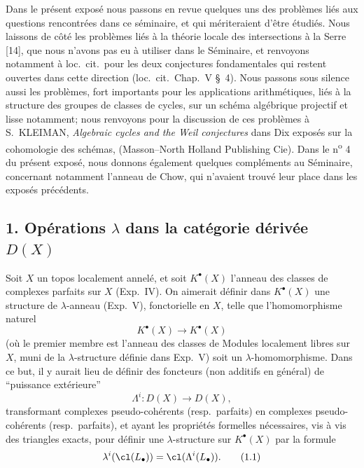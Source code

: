 Dans le pr\'esent expos\'e nous passons en revue quelques uns des probl\`emes li\'es aux questions rencontr\'ees dans ce s\'eminaire, et qui m\'eriteraient d'\^etre \'etudi\'es. Nous laissons de c\^ot\'e les probl\`emes li\'es \`a la th\'eorie locale des intersections \`a la Serre [14], que nous n'avons pas eu \`a utiliser dans le S\'eminaire, et renvoyons notamment \`a loc.\ cit.\ pour les deux conjectures fondamentales qui restent ouvertes dans cette direction (loc.\ cit.\ Chap.\ V \S\ 4). Nous passons sous silence aussi les probl\`emes, fort importants pour les applications arithm\'etiques, li\'es \`a la structure des groupes de classes de cycles, sur un sch\'ema alg\'ebrique projectif et lisse notamment; nous renvoyons pour la discussion de ces probl\`emes \`a S.\ KLEIMAN, \textit{Algebraic cycles and the Weil conjectures} dans Dix expos\'es sur la cohomologie des sch\'emas, (Masson--North Holland Publishing Cie). Dans le n\textsuperscript{o} 4 du pr\'esent expos\'e, nous donnons \'egalement quelques compl\'ements au S\'eminaire, concernant notamment l'anneau de Chow, qui n'avaient trouv\'e leur place dans les expos\'es pr\'ec\'edents.

\subsection*{1. Op\'erations $\lambda$ dans la cat\'egorie d\'eriv\'ee $D(X)$}

Soit $X$ un topos localement annel\'e, et soit $K^\bullet(X)$ l'anneau des classes de complexes parfaits sur $X$ (Exp.\ IV). On aimerait d\'efinir dans $K^\bullet(X)$ une structure de $\lambda$-anneau (Exp.\ V), fonctorielle en $X$, telle que l'homomorphisme naturel
\[
K^\bullet(X) \to K^\bullet(X)
\]
(o\`u le premier membre est l'anneau des classes de Modules localement libres sur $X$, muni de la $\lambda$-structure d\'efinie dans Exp.\ V) soit un $\lambda$-homomorphisme. Dans ce but, il y aurait lieu de d\'efinir des foncteurs (non additifs en g\'en\'eral) de ``puissance ext\'erieure''
\[
\Lambda^i : D(X) \to D(X),
\]
transformant complexes pseudo-coh\'erents (resp.\ parfaits) en complexes pseudo-coh\'erents (resp.\ parfaits), et ayant les propri\'et\'es formelles n\'ecessaires, vis \`a vis des triangles exacts, pour d\'efinir une $\lambda$-structure sur $K^\bullet(X)$ par la formule
\[
\lambda^i(\cl(L_\bullet)) = \cl(\Lambda^i(L_\bullet)). \tag{1.1}
\]

